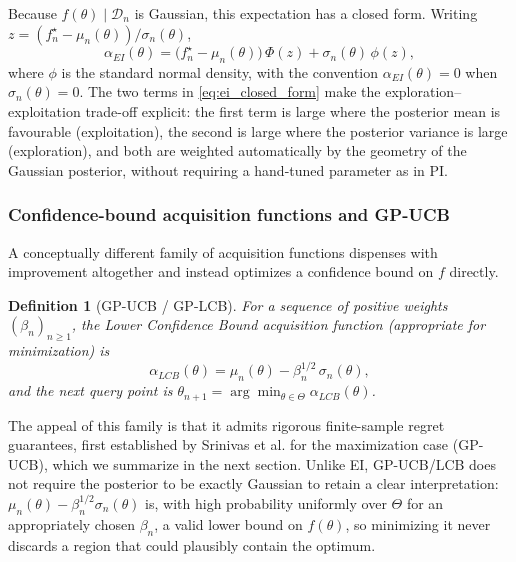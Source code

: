 \documentclass{article}
\newtheorem{defn}{Definition}
\begin{document}
	Because $f(\theta) \mid \mathcal{D}_n$ is Gaussian, this expectation has a closed form. Writing $z = (f^\star_n - \mu_n(\theta))/\sigma_n(\theta)$,
	\begin{equation} \label{eq:ei_closed_form}
		\alpha_{EI}(\theta) = \big(f^\star_n - \mu_n(\theta)\big) \, \Phi(z) + \sigma_n(\theta) \, \phi(z),
	\end{equation}
	where $\phi$ is the standard normal density, with the convention $\alpha_{EI}(\theta) = 0$ when $\sigma_n(\theta) = 0$. The two terms in \eqref{eq:ei_closed_form} make the exploration–exploitation trade-off explicit: the first term is large where the posterior mean is favourable (exploitation), the second is large where the posterior variance is large (exploration), and both are weighted automatically by the geometry of the Gaussian posterior, without requiring a hand-tuned parameter as in PI.
	
	\subsubsection{Confidence-bound acquisition functions and GP-UCB}
	
	A conceptually different family of acquisition functions dispenses with improvement altogether and instead optimizes a confidence bound on $f$ directly.
	
	\begin{defn}[GP-UCB / GP-LCB]
		For a sequence of positive weights $(\beta_n)_{n \ge 1}$, the \textit{Lower Confidence Bound} acquisition function (appropriate for minimization) is
		\begin{equation}
			\alpha_{LCB}(\theta) = \mu_n(\theta) - \beta_n^{1/2} \, \sigma_n(\theta),
		\end{equation}
		and the next query point is $\theta_{n+1} = \arg\min_{\theta \in \Theta} \alpha_{LCB}(\theta)$.
	\end{defn}
	
	The appeal of this family is that it admits rigorous finite-sample regret guarantees, first established by Srinivas et al. \cite{Srinivas2010} for the maximization case (GP-UCB), which we summarize in the next section. Unlike EI, GP-UCB/LCB does not require the posterior to be exactly Gaussian to retain a clear interpretation: $\mu_n(\theta) - \beta_n^{1/2}\sigma_n(\theta)$ is, with high probability uniformly over $\Theta$ for an appropriately chosen $\beta_n$, a valid lower bound on $f(\theta)$, so minimizing it never discards a region that could plausibly contain the optimum.
	
\end{document}
